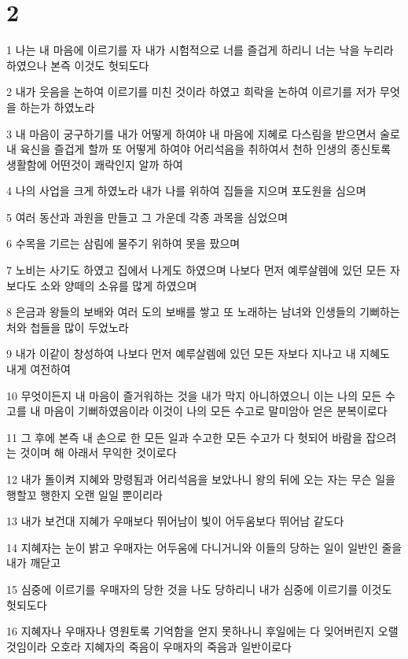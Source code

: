 \chapter{2}

\par 1 나는 내 마음에 이르기를 자 내가 시험적으로 너를 즐겁게 하리니 너는 낙을 누리라 하였으나 본즉 이것도 헛되도다
\par 2 내가 웃음을 논하여 이르기를 미친 것이라 하였고 희락을 논하여 이르기를 저가 무엇을 하는가 하였노라
\par 3 내 마음이 궁구하기를 내가 어떻게 하여야 내 마음에 지혜로 다스림을 받으면서 술로 내 육신을 즐겁게 할까 또 어떻게 하여야 어리석음을 취하여서 천하 인생의 종신토록 생활함에 어떤것이 쾌락인지 알까 하여
\par 4 나의 사업을 크게 하였노라 내가 나를 위하여 집들을 지으며 포도원을 심으며
\par 5 여러 동산과 과원을 만들고 그 가운데 각종 과목을 심었으며
\par 6 수목을 기르는 삼림에 물주기 위하여 못을 팠으며
\par 7 노비는 사기도 하였고 집에서 나게도 하였으며 나보다 먼저 예루살렘에 있던 모든 자보다도 소와 양떼의 소유를 많게 하였으며
\par 8 은금과 왕들의 보배와 여러 도의 보배를 쌓고 또 노래하는 남녀와 인생들의 기뻐하는 처와 첩들을 많이 두었노라
\par 9 내가 이같이 창성하여 나보다 먼저 예루살렘에 있던 모든 자보다 지나고 내 지혜도 내게 여전하여
\par 10 무엇이든지 내 마음이 즐거워하는 것을 내가 막지 아니하였으니 이는 나의 모든 수고를 내 마음이 기뻐하였음이라 이것이 나의 모든 수고로 말미암아 얻은 분복이로다
\par 11 그 후에 본즉 내 손으로 한 모든 일과 수고한 모든 수고가 다 헛되어 바람을 잡으려는 것이며 해 아래서 무익한 것이로다
\par 12 내가 돌이켜 지혜와 망령됨과 어리석음을 보았나니 왕의 뒤에 오는 자는 무슨 일을 행할꼬 행한지 오랜 일일 뿐이리라
\par 13 내가 보건대 지혜가 우매보다 뛰어남이 빛이 어두움보다 뛰어남 같도다
\par 14 지혜자는 눈이 밝고 우매자는 어두움에 다니거니와 이들의 당하는 일이 일반인 줄을 내가 깨닫고
\par 15 심중에 이르기를 우매자의 당한 것을 나도 당하리니 내가 심중에 이르기를 이것도 헛되도다
\par 16 지혜자나 우매자나 영원토록 기억함을 얻지 못하나니 후일에는 다 잊어버린지 오랠 것임이라 오호라 지혜자의 죽음이 우매자의 죽음과 일반이로다
